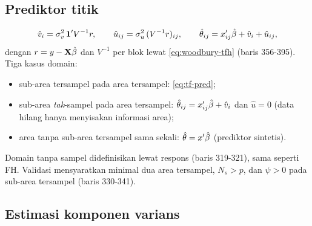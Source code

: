 \subsection{Prediktor titik}\label{sec:twofold-prediktor}

\begin{equation}
  \hat v_i=\sigma_v^2\,\mathbf{1}'V^{-1}r,\qquad
  \hat u_{ij}=\sigma_u^2\,(V^{-1}r)_{ij},\qquad
  \hat\theta_{ij}=x_{ij}'\hat\beta+\hat v_i+\hat u_{ij},
  \label{eq:tf-pred}
\end{equation}
dengan $r=y-\mathbf{X}\hat\beta$ dan $V^{-1}$ per blok lewat \eqref{eq:woodbury-tfh}
(baris 356-395). Tiga kasus domain:
\begin{itemize}
  \item sub-area tersampel pada area tersampel: \eqref{eq:tf-pred};
  \item sub-area \emph{tak}-sampel pada area tersampel:
        $\hat\theta_{ij}=x_{ij}'\hat\beta+\hat v_i$ dan $\hat u=0$ (data hilang
        hanya menyisakan informasi area);
  \item area tanpa sub-area tersampel sama sekali: $\hat\theta=x'\hat\beta$
        (prediktor sintetis).
\end{itemize}
Domain tanpa sampel didefinisikan lewat respons 
(baris 319-321), sama seperti FH. Validasi mensyaratkan minimal dua area
tersampel, $N_s>p$, dan $\psi>0$ pada sub-area tersampel (baris 330-341).

\subsection{Estimasi komponen varians}\label{sec:twofold-varians}

